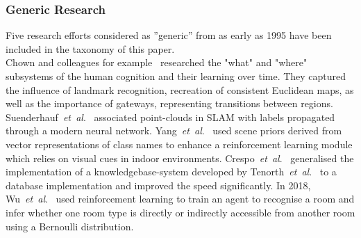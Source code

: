 \documentclass[twocolumn,letterpaper]{IEEEAerospaceCLS}  %
\newcommand{\abbreviation}[1]{\emph{#1}.}
\newcommand{\etal}{\abbreviation{et~al}}
\begin{document}
\subsubsection{Generic Research} \label{sssec:ResLitHist}
Five research efforts considered as ''generic'' from as early as 1995  have been included in the taxonomy of this paper.\\
Chown and colleagues for example~\cite{chown_prototypes_1995} researched the "what" and "where" subsystems of the human cognition and their learning over time. They captured the influence of landmark recognition, recreation of consistent Euclidean maps, as well as the importance of gateways, representing transitions between regions. Suenderhauf~\etal~\cite{sunderhauf_meaningful_2017} associated point-clouds in SLAM with labels propagated through a modern neural network. Yang~\etal~\cite{yang_visual_2018} used scene priors derived from vector representations of class names to enhance a reinforcement learning module which relies on visual cues in indoor environments. Crespo~\etal~\cite{crespo_reasoning_2018} generalised the implementation of a knowledgebase-system developed by Tenorth~\etal~\cite{tenorth_knowrob-map_2010} to a database implementation and improved the speed significantly. In 2018, Wu~\etal~\cite{wu_learning_2018} used reinforcement learning to train an agent to recognise a room and infer whether one room type is directly or indirectly accessible from another room using a Bernoulli distribution.
\end{document}
